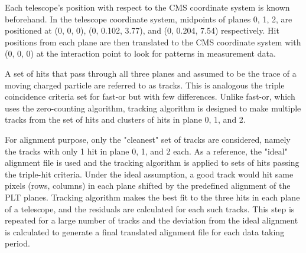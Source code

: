 Each telescope's position with respect to the CMS coordinate system is known beforehand. In the telescope coordinate system, midpoints of planes 0, 1, 2, are positioned at (0, 0, 0), (0, 0.102, 3.77), and (0, 0.204, 7.54) respectively. Hit positions from each plane are then translated to the CMS coordinate system with (0, 0, 0) at the interaction point to look for patterns in measurement data.


A set of hits that pass through all three planes and assumed to be the trace of a moving charged particle are referred to as tracks. This is analogous the triple coincidence criteria set for fast-or but with few differences. Unlike fast-or, which uses the zero-counting algorithm, tracking algorithm is designed to make multiple tracks from the set of hits and clusters of hits in plane 0, 1, and 2. 
 
For alignment purpose, only the "cleanest" set of tracks are considered, namely the tracks with only 1 hit in plane 0, 1, and 2 each. As a reference, the "ideal" alignment file is used and the tracking algorithm is applied to sets of hits passing the triple-hit criteria. Under the ideal assumption, a good track would hit same pixels (rows, columns) in each plane shifted by the predefined alignment of the PLT planes. Tracking algorithm makes the best fit to the three hits in each plane of a telescope, and the residuals are calculated for each such tracks. This step is repeated for a large number of tracks and the deviation from the ideal alignment is calculated to generate a final translated alignment file for each data taking period.






